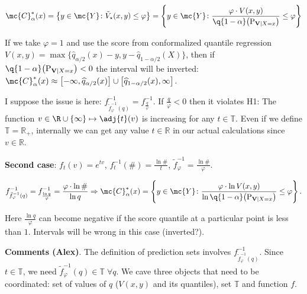 \begin{equation}
  \mc{C}_{\alpha}^*(x) = \bigl\{y \in \mc{Y}\colon \tilde{V}_\star(x, y) \leq \varphi\bigr\} = \left\{y \in \mc{Y}\colon \frac{\varphi \cdot V(x,y)}{\q{1 - \alpha}\bigl(\textup{P}_{\mathbf{V} \mid X = x}\bigr)} \leq \varphi\right\}
\end{equation}

If we take $\varphi=1$ and use the score from conformalized quantile regression $V(x, y) = \max \{\widehat{q}_{\alpha/2}(x) - y, y - \widehat{q}_{1 - \alpha/2}(X)\}$, then if $\q{1 - \alpha}\bigl(\textup{P}_{\mathbf{V} \mid X = x}\bigr) < 0$ the interval will be inverted: $\mc{C}_{\alpha}^*(x) \approx \left[ -\infty, \widehat{q}_{\alpha/2}(x) \right] \cup \left[ \widehat{q}_{1-\alpha/2}(x), \infty\right]$. 

I suppose the issue is here: $f_{\tilde{f}_\varphi^{-1}(q)}^{-1} = f_{\frac{q}{\varphi}}^{-1}$. If $\frac{q}{\varphi} < 0$ then it violates H1: The function $v\in\R \cup\{\infty\}\mapsto \adj{t}(v)$ is increasing for any $t\in\mathbb{T}$. Even if we define $\mathbb{T}=\mathbb{R}_{+}$, internally we can get any value $t \in \mathbb{R}$ in our actual calculations since $v \in \mathbb{R}$.

\textbf{Second case}: $f_t(v) = e^{tv}$,  $f_{t}^{-1}(\#)=\frac{\ln\#}{t}$, $\tilde{f}_\varphi^{-1}=\frac{\ln\#}{\varphi}$.

\begin{equation}
    f_{\tilde{f}_\varphi^{-1}(q)}^{-1} = f_{\frac{\ln q}{\varphi}}^{-1}= \frac{\varphi \cdot \ln \#}{\ln q} \Rightarrow \mc{C}_{\alpha}^*(x) = \left\{y \in \mc{Y}\colon \frac{\varphi \cdot \ln V(x,y)}{\ln \q{1 - \alpha}\bigl(\textup{P}_{\mathbf{V} \mid X = x}\bigr)} \leq \varphi\right\}.
\end{equation}

Here $\frac{\ln q}{\varphi}$ can become negative if the score quantile at a particular point is less than $1$. Intervals will be wrong in this case (inverted?).

\textbf{Comments (Alex)}. The definition of prediction sets involves $f_{\tilde{f}_\varphi^{-1}(q)}^{-1}$. Since $t \in \mathbb{T}$, we need $\tilde{f}_\varphi^{-1}(q) \in \mathbb{T} \; \forall q$. We cave three objects that need to be coordinated: set of values of $q$ ($V(x,y)$ and its quantiles), set $\mathbb{T}$ and function $f$.
